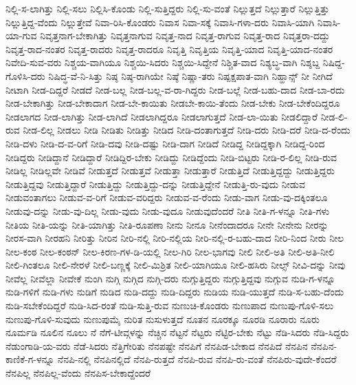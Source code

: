 {ನಿಲ್ಲಿ-ಸ-ಲಾಗಿತ್ತು
ನಿಲ್ಲಿ-ಸಲು
ನಿಲ್ಲಿಸಿ-ಕೊಂಡು
ನಿಲ್ಲಿ-ಸುತ್ತಿದ್ದರು
ನಿಲ್ಲಿ-ಸು-ವಂತೆ
ನಿಲ್ಲುತ್ತದೆ
ನಿಲ್ಲುತ್ತಾರೆ
ನಿಲ್ಲುತ್ತಿತ್ತು
ನಿಲ್ಲುತ್ತಿದ್ದ-ವೆಂದು
ನಿಲ್ಲುತ್ತೇವೆ
ನಿವಾ-ರಿಸಿ-ಕೊಂಡರು
ನಿವಾಸ
ನಿವಾ-ಸಕ್ಕೆ
ನಿವಾಸಿ-ಗಳಾ-ದರು
ನಿವಾಸಿ-ಯಾಗಿ
ನಿವಾಸಿ-ಯಾ-ಗುವ
ನಿವೃತ್ತನಾಗ-ಬೇಕಾಗಿತ್ತು
ನಿವೃತ್ತನಾಗುವ
ನಿವೃತ್ತ-ನಾದ
ನಿವೃತ್ತ-ರಾಗುವ
ನಿವೃತ್ತ-ರಾದ
ನಿವೃತ್ತರಾ-ದದ್ದು
ನಿವೃತ್ತ-ರಾದ-ನಂತರ
ನಿವೃತ್ತ-ರಾದರು
ನಿವೃತ್ತ-ರಾದರೂ
ನಿವೃತ್ತಿ
ನಿವೃತ್ತಿಯ
ನಿವೃತ್ತಿ-ಯಾದ
ನಿವೃತ್ತಿ-ಯಾದ-ನಂತರ
ನಿವೇದಿ-ಸುವ-ವರು
ನಿಶ್ಚಯ-ವಾಗಿಯೂ
ನಿಶ್ಚಯಿ-ಸಿದರು
ನಿಶ್ಚಯಿ-ಸಿದ್ದೇನೆ
ನಿಶ್ಚಿತ-ವಾದ
ನಿಶ್ಯಬ್ಧ-ವಾಗಿ
ನಿಶ್ಶಬ್ದ
ನಿಷಿದ್ದ-ಗೊಳಿಸಿ-ದರು
ನಿಷಿದ್ಧ-ವೆ-ನಿ-ಸಿತ್ತು
ನಿಷ್ಠ
ನಿಷ್ಠ-ರಾಗಿಯೇ
ನಿಷ್ಠೆ
ನಿಷ್ಣಾ-ತರು
ನಿಷ್ಪಕ್ಷಪಾತ-ವಾಗಿ
ನಿಹ್ಹಾನ್ಸ್
ನೀ
ನೀಗಿದೆ
ನೀಟಾಗಿ
ನೀಡ-ದಿದ್ದರೆ
ನೀಡದೆ
ನೀಡ-ಬಲ್ಲ
ನೀಡ-ಬಲ್ಲ-ವ-ರಾ-ಗಿದ್ದರು
ನೀಡ-ಬಲ್ಲೆ
ನೀಡ-ಬಹು-ದಾದ
ನೀಡ-ಬಾ-ರದು
ನೀಡ-ಬೇಕಾಗಿತ್ತು
ನೀಡ-ಬೇಕಾದಾಗ
ನೀಡ-ಬೇ-ಕಾಯಿತು
ನೀಡಬೇ-ಕಾಯಿ-ತೆಂದು
ನೀಡ-ಬೇಕು
ನೀಡ-ಬೇಕೆಂದಿದ್ದರೂ
ನೀಡಲಾಗದ
ನೀಡ-ಲಾಗಿತ್ತು
ನೀಡ-ಲಾಗಿದೆ
ನೀಡಲಾಗಿದ್ದರೂ
ನೀಡಲಾಗುತ್ತದೆ
ನೀಡ-ಲಾ-ಯಿತು
ನೀಡಲಿದ್ದಾರೆ
ನೀಡ-ಲಿ-ರುವ
ನೀಡ-ಲಿಲ್ಲ
ನೀಡಲು
ನೀಡಿ
ನೀಡಿತು
ನೀಡಿತ್ತು
ನೀಡಿದ
ನೀಡಿ-ದಂತಾಗುತ್ತದೆ
ನೀಡಿ-ದರು
ನೀಡಿ-ದರೆ
ನೀಡಿ-ದ-ರೆಂದು
ನೀಡಿ-ದಳು
ನೀಡಿ-ದ-ವ-ರಿಗೆ
ನೀಡಿ-ದವು
ನೀಡಿ-ದಷ್ಟು
ನೀಡಿ-ದಾಗ
ನೀಡಿದೆ
ನೀಡಿದ್ದ
ನೀಡಿದ್ದಕ್ಕಾಗಿ
ನೀಡಿದ್ದ-ರಿಂದ
ನೀಡಿದ್ದರು
ನೀಡಿದ್ದಾನೆ
ನೀಡಿದ್ದಾರೆ
ನೀಡಿದ್ದಿರ-ಬೇಕು
ನೀಡಿದ್ದು
ನೀಡಿದ್ದೆಂದು
ನೀಡಿ-ಬಿಟ್ಟರು
ನೀಡಿ-ರ-ಲಿಲ್ಲ
ನೀಡಿ-ರುವ
ನೀಡಿಲ್ಲ
ನೀಡಿಲ್ಲವೇ
ನೀಡಿವೆ
ನೀಡುತ್ತದೆ
ನೀಡುತ್ತವೆ
ನೀಡುತ್ತಾ
ನೀಡುತ್ತಾರೆ
ನೀಡುತ್ತಿದೆ
ನೀಡುತ್ತಿದ್ದದ್ದು
ನೀಡುತ್ತಿದ್ದರು
ನೀಡುತ್ತಿದ್ದವು
ನೀಡುತ್ತಿದ್ದಾರೆ
ನೀಡುತ್ತಿದ್ದು
ನೀಡುತ್ತಿದ್ದು-ದನ್ನು
ನೀಡುತ್ತಿದ್ದೇನೆ
ನೀಡುತ್ತಿ-ರು-ವುದು
ನೀಡುವ
ನೀಡುವಂತಾಗಲು
ನೀಡುವ-ವ-ರಿಗೆ
ನೀಡುವ-ವರಿದ್ದರು
ನೀಡುವ-ವ-ರೆಂದು
ನೀಡು-ವಾಗ
ನೀಡು-ವು-ದಕ್ಕಿಂತಲೂ
ನೀಡುವು-ದನ್ನು
ನೀಡು-ವು-ದಿಲ್ಲ
ನೀಡು-ವುದು
ನೀಡು-ವುದೂ
ನೀಡುವುದೆಂದರೆ
ನೀತಿ
ನೀತಿ-ಗ-ಳನ್ನೂ
ನೀತಿ-ಗಳು
ನೀತಿಯ
ನೀತಿ-ಯನ್ನು
ನೀತಿ-ಯಾಗಿತ್ತು
ನೀತಿ-ರೂಪಣಾ
ನೀನು
ನೀನೂ
ನೀನೆಂದಾದರೂ
ನೀನೇ
ನೀನೇನು
ನೀರನ್ನು
ನೀರಸ-ವಾಗಿ
ನೀರಹನಿ
ನೀರಿತ್ತು
ನೀರಿನ
ನೀರಿ-ನಲ್ಲಿ
ನೀರಿ-ನಲ್ಲಿಯ
ನೀರಿ-ನಲ್ಲಿ-ರ-ಬಹು-ದಾದ
ನೀರಿ-ನಿಂದ
ನೀರು
ನೀಲ
ನೀಲ-ಕಂಠ
ನೀಲ-ಕಂಠನ್
ನೀಲ-ಕಿರಣ-ಗಳ-ಡಿ-ಯಲ್ಲಿ
ನೀಲ-ಗಿರಿ
ನೀಲ-ಭಾಗವು
ನೀಲಿ
ನೀಲಿ-ಅತಿ
ನೀಲಿ-ಅತಿ-ನೀಲಿ
ನೀಲಿ-ಗಿಂತಲೂ
ನೀಲಿ-ನೇರಳೆ
ನೀಲಿ-ಬಣ್ಣಕ್ಕೆ
ನೀಲಿ-ಮಿಶ್ರಿತ
ನೀಲಿ-ಯಾಗಿಯೂ
ನೀಲಿ-ಹಸಿರು
ನೀಲ್ಸ್
ನೀವಿ-ದನ್ನು
ನೀವು
ನೀವೆಲ್ಲ
ನೀವೆಲ್ಲಾ
ನೀವೇಕೆ
ನುಂಗಿ
ನುಗ್ಗಿ
ನುಗ್ಗಿದ
ನುಗ್ಗಿ-ದರು
ನುಗ್ಗುತ್ತಿದ್ದರು
ನುಗ್ಗುತ್ತಿದ್ದವು
ನುಗ್ಗುವ
ನುಡಿ-ಗ-ಳನ್ನೂ
ನುಡಿ-ಗಳಿಗೆ
ನುಡಿ-ಗಳು
ನುಡಿಗೆ
ನುಡಿದ
ನುಡಿ-ದದ್ದು
ನುಡಿ-ದಿದ್ದರು
ನುಡಿಯ
ನುಡಿ-ಯುತ್ತದೆ
ನುಡಿ-ಸ-ಬಹು-ದೆಂದು
ನುಡಿ-ಸಬೇಕೆಂದಿದ್ದರೆ
ನುಡಿ-ಸಿದ-ರಂತೆ
ನುಡಿ-ಸುತ್ತಿ-ರುವ
ನುಣುಚಿ-ಕೊಂಡರು
ನುಣುಪಾದ
ನುಣುಪು-ಗೊಳಿ-ಸಲು
ನುಣುಪು-ಗೊಳಿ-ಸುವುದು
ನುಣುಪುಮೈ
ನುರಿತ
ನುಸುಳುತ್ತದೆ
ನೂತನ
ನೂರಕ್ಕೂ
ನೂರಡಿ
ನೂರಾರು
ನೂರು
ನೂರ್ಮಡಿ
ನೂಲಿನ
ನೂಲು
ನೆ
ನೆಗೆ-ಟೀವ್ಗಳನ್ನು
ನೆಚ್ಚಿನ
ನೆಟ್ಟನೆ
ನೆಟ್ಟರು
ನೆಟ್ಟಿರ-ಬೇಕು
ನೆಟ್ಟು
ನೆಡಿ-ಸಿದರು
ನೆಡಿ-ಸಿದ್ದರು
ನೆಡುಂಗಾಡಿ-ಯ-ವರು
ನೆಡೆ-ಸಿದರು
ನೆತ್ತಿಗೇರಿತು
ನೆನಪಷ್ಟೇ
ನೆನಪಿಗೆ
ನೆನಪಿಡ-ಬೇಕಾದ
ನೆನಪಿದೆ
ನೆನಪಿನ
ನೆನಪಿನ-ಕಾಣಿಕೆ-ಗ-ಳನ್ನೂ
ನೆನಪಿ-ನಲ್ಲಿ
ನೆನಪಿನಲ್ಲಿದೆ
ನೆನಪಿ-ರುತ್ತದೆ
ನೆನಪಿ-ರುವ
ನೆನಪಿ-ರು-ವಂತೆ
ನೆನಪಿರು-ವುದೇ-ಕೆಂದರೆ
ನೆನಪಿಲ್ಲ
ನೆನಪಿಲ್ಲ-ವೆಂದು
ನೆನಪಿಸ-ಬೇಕಾದ್ದೆಂದರೆ
}
